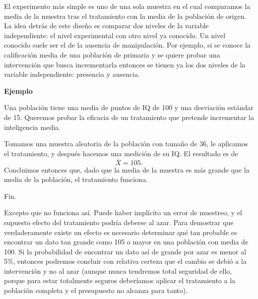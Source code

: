 \documentclass[a4paper,12pt]{article}
\begin{document}

El experimento más simple es uno de una sola muestra en el cual comparamos la media de la muestra tras el tratamiento con la media de la población de origen.
La idea detrás de este diseño es comparar dos niveles de la variable independiente: el nivel experimental con otro nivel ya conocido. Un nivel conocido suele ser el de la ausencia de manipulación. Por ejemplo, si se conoce la calificación media de una población de primaria y se quiere probar una intervención que busca incrementarla entonces se tienen ya los dos niveles de la variable independiente: presencia y ausencia.

{\noindent\bfseries Ejemplo}

Una población tiene una media de puntos de IQ de 100 y una desviación estándar de 15. Queremos probar la eficacia de un tratamiento que pretende incrementar la inteligencia media.

Tomamos una muestra aleatoria de la población con tamaño de 36, le aplicamos el tratamiento, y después hacemos una medición de su IQ. El resultado es de
\[
  \bar{X} = 105
.\]
Concluimos entonces que, dado que la media de la muestra es más grande que la media de la población, el tratamiento funciona.

Fin.

\newpage

Excepto que no funciona así. Puede haber implícito un error de muestreo, y el supuesto efecto del tratamiento podría deberse al azar. Para demostrar que verdaderamente existe un efecto es necesario determinar qué tan probable es encontrar un dato tan grande como 105 o mayor en una población con  media de 100. Si la probabilidad de encontrar un dato así de grande por azar es menor al 5\%, entonces podremos concluir con relativa certeza que el cambio se debió a la intervención y no al azar (aunque nunca tendremos total seguridad de ello, porque para estar totalmente seguros deberíamos aplicar el tratamiento a la población completa y el presupuesto no alcanza para tanto).
\end{document}

